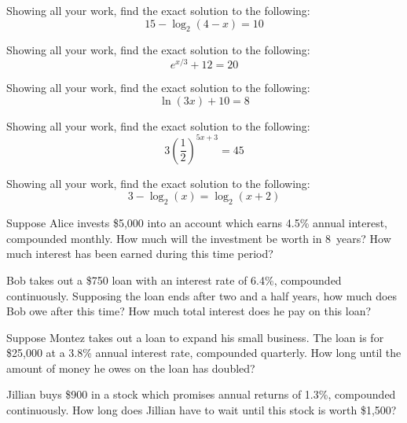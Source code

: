 \documentclass[12pt,letterpaper]{exam}
\begin{document}
\begin{questions}
\newpage
\question[10] Showing all your work, find the exact solution to the following:  
	\[
	15 - \log_2(4 - x)= 10
	\]



\newpage
\question[10] Showing all your work, find the exact solution to the following: 
	\[
	e^{x/3} + 12= 20
	\]



\newpage
\question[10] Showing all your work, find the exact solution to the following: 
	\[
	\ln(3x) + 10= 8
	\]



\newpage
\question[10] Showing all your work, find the exact solution to the following: 
	\[
	3\left( \dfrac{1}{2} \right)^{5x + 3}= 45
	\]



\newpage
\question[10] Showing all your work, find the exact solution to the following: 
	\[
	3 - \log_2(x)= \log_2(x + 2)
	\]



\newpage
\question[10] Suppose Alice invests \$5,000 into an account which earns 4.5\% annual interest, compounded monthly. How much will the investment be worth in 8~years? How much interest has been earned during this time period? 



\newpage
\question[10] Bob takes out a \$750 loan with an interest rate of 6.4\%, compounded continuously. Supposing the loan ends after two and a half years, how much does Bob owe after this time? How much total interest does he pay on this loan?



\newpage
\question[10] Suppose Montez takes out a loan to expand his small business. The loan is for \$25,000 at a 3.8\% annual interest rate, compounded quarterly. How long until the amount of money he owes on the loan has doubled?



\newpage
\question[10] Jillian buys \$900 in a stock which promises annual returns of 1.3\%, compounded continuously. How long does Jillian have to wait until this stock is worth \$1,500?


\end{questions}
\end{document}
